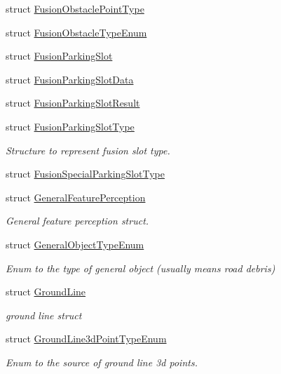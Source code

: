 \begin{DoxyCompactItemize}
\item 
struct \hyperlink{structmaf__perception__interface_1_1FusionObstaclePointType}{Fusion\+Obstacle\+Point\+Type}
\item 
struct \hyperlink{structmaf__perception__interface_1_1FusionObstacleTypeEnum}{Fusion\+Obstacle\+Type\+Enum}
\item 
struct \hyperlink{structmaf__perception__interface_1_1FusionParkingSlot}{Fusion\+Parking\+Slot}
\item 
struct \hyperlink{structmaf__perception__interface_1_1FusionParkingSlotData}{Fusion\+Parking\+Slot\+Data}
\item 
struct \hyperlink{structmaf__perception__interface_1_1FusionParkingSlotResult}{Fusion\+Parking\+Slot\+Result}
\item 
struct \hyperlink{structmaf__perception__interface_1_1FusionParkingSlotType}{Fusion\+Parking\+Slot\+Type}
\begin{DoxyCompactList}\small\item\em Structure to represent fusion slot type. \end{DoxyCompactList}\item 
struct \hyperlink{structmaf__perception__interface_1_1FusionSpecialParkingSlotType}{Fusion\+Special\+Parking\+Slot\+Type}
\item 
struct \hyperlink{structmaf__perception__interface_1_1GeneralFeaturePerception}{General\+Feature\+Perception}
\begin{DoxyCompactList}\small\item\em General feature perception struct. \end{DoxyCompactList}\item 
struct \hyperlink{structmaf__perception__interface_1_1GeneralObjectTypeEnum}{General\+Object\+Type\+Enum}
\begin{DoxyCompactList}\small\item\em Enum to the type of general object (usually means road debris) \end{DoxyCompactList}\item 
struct \hyperlink{structmaf__perception__interface_1_1GroundLine}{Ground\+Line}
\begin{DoxyCompactList}\small\item\em ground line struct \end{DoxyCompactList}\item 
struct \hyperlink{structmaf__perception__interface_1_1GroundLine3dPointTypeEnum}{Ground\+Line3d\+Point\+Type\+Enum}
\begin{DoxyCompactList}\small\item\em Enum to the source of ground line 3d points. \end{DoxyCompactList}\item 

\end{DoxyCompactItemize}
